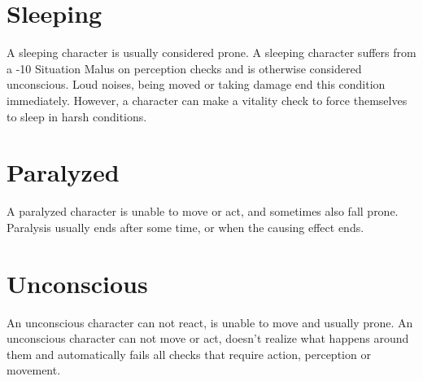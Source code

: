 \section{Sleeping}\label{condition:sleeping}
A sleeping character is usually considered prone.
A sleeping character suffers from a -10 Situation Malus on perception checks and is otherwise considered unconscious.
Loud noises, being moved or taking damage end this condition immediately.
However, a character can make a vitality check to force themselves to sleep in harsh conditions.

\section{Paralyzed}\label{condition:paralyzed}
A paralyzed character is unable to move or act, and sometimes also fall prone.
Paralysis usually ends after some time, or when the causing effect ends.

\section{Unconscious}\label{condition:unconscious}
An unconscious character can not react, is unable to move and usually prone.
An unconscious character can not move or act, doesn't realize what happens around them and automatically fails all checks that require action, perception or movement.
